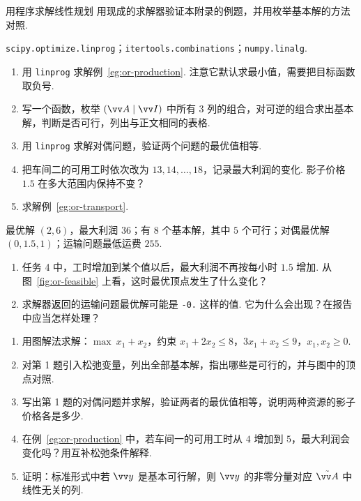 \begin{codebox}{用程序求解线性规划}
	 用现成的求解器验证本附录的例题，并用枚举基本解的方法对照.

	 \texttt{scipy.optimize.linprog}；\texttt{itertools.combinations}；\texttt{numpy.linalg}.

	\begin{enumerate}
		\item 用 \texttt{linprog} 求解例~\ref{eg:or-production}. 注意它默认求最小值，需要把目标函数取负号.
		\item 写一个函数，枚举 $(\vv A\mid\vv I)$ 中所有 $3$ 列的组合，对可逆的组合求出基本解，判断是否可行，列出与正文相同的表格.
		\item 用 \texttt{linprog} 求解对偶问题，验证两个问题的最优值相等.
		\item 把车间二的可用工时依次改为 $13,14,\ldots,18$，记录最大利润的变化. 影子价格 $1.5$ 在多大范围内保持不变？
		\item 求解例~\ref{eg:or-transport}.
	\end{enumerate}

	 最优解 $(2,6)$，最大利润 $36$；有 $8$ 个基本解，其中 $5$ 个可行；对偶最优解 $(0,1.5,1)$；运输问题最低运费 $255$.

	\begin{enumerate}
		\item 任务 4 中，工时增加到某个值以后，最大利润不再按每小时 $1.5$ 增加. 从图~\ref{fig:or-feasible} 上看，这时最优顶点发生了什么变化？
		\item 求解器返回的运输问题最优解可能是 \texttt{-0.} 这样的值. 它为什么会出现？在报告中应当怎样处理？
	\end{enumerate}
\end{codebox}

\begin{exercise}\label{exo:or}
	\begin{enumerate}
		\item 用图解法求解：$\max\ x_1+x_2$，约束 $x_1+2x_2\le8$，$3x_1+x_2\le9$，$x_1,x_2\ge0$.
		\item 对第 1 题引入松弛变量，列出全部基本解，指出哪些是可行的，并与图中的顶点对照.
		\item 写出第 1 题的对偶问题并求解，验证两者的最优值相等，说明两种资源的影子价格各是多少.
		\item 在例~\ref{eg:or-production} 中，若车间一的可用工时从 $4$ 增加到 $5$，最大利润会变化吗？用互补松弛条件解释.
		\item 证明：标准形式中若 $\vv y$ 是基本可行解，则 $\vv y$ 的非零分量对应 $\tilde{\vv A}$ 中线性无关的列.
	\end{enumerate}
\end{exercise}

